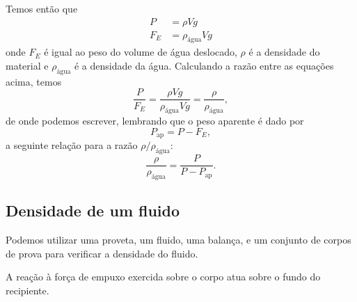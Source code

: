Temos então que
\begin{align}
	P &= \rho Vg \\
	F_E &= \rho_{\textrm{água}} V g
\end{align}
%
onde $F_E$ é igual ao peso do volume de água deslocado, $\rho$ é a densidade do material e $\rho_{\textrm{água}}$ é a densidade da água. Calculando a razão entre as equações acima, temos
\begin{equation}
	\frac{P}{F_E} = \frac{\rho Vg}{\rho_{\textrm{água}}Vg} = \frac{\rho}{\rho_{\textrm{água}}},
\end{equation}
%
de onde podemos escrever, lembrando que o peso aparente é dado por
\begin{equation}
	P_{\textrm{ap}} = P - F_E,
\end{equation}
%
a seguinte relação para a razão $\rho/\rho_{\textrm{água}}$:
\begin{equation}\label{Eq:DensRelativa}
	\frac{\rho}{\rho_{\textrm{água}}} = \frac{P}{P-P_{\textrm{ap}}}.
\end{equation}

\subsection{Densidade de um fluido}

Podemos utilizar uma proveta, um fluido, uma balança, e um conjunto de corpos de prova para verificar a densidade do fluido.


\begin{marginfigure}
\centering
{}
\caption{A reação à força de empuxo exercida sobre o corpo atua sobre o fundo do recipiente.\label{Fig:ReacaoEmpuxo}}
\end{marginfigure}

